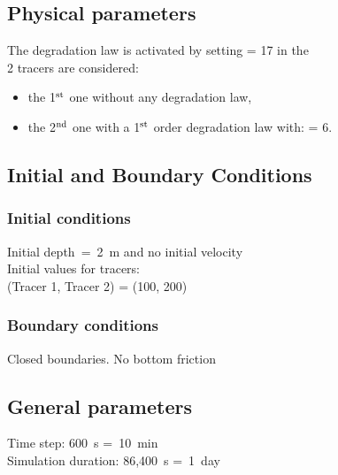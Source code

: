 \subsection{Physical parameters}
%
The degradation law is activated by setting  = 17
in the  \\

2 tracers are considered:
\begin{itemize}
\item the 1$^{\rm{st}}$ one without any degradation law,
\item the 2$^{\rm{nd}}$ one with a 1$^{\rm{st}}$ order degradation law with:
   = 6.
\end{itemize}

%
%
%
%
%
%
\subsection{Initial and Boundary Conditions}
%
\subsubsection{Initial conditions}
%
Initial depth~=~2~m
and no initial velocity\\
Initial values for tracers:\\
(Tracer 1, Tracer 2) =
(100, 200)
%
\subsubsection{Boundary conditions}
%
Closed boundaries. No bottom friction
%
\subsection{General parameters}
%
Time step: 600~s =~10~min\\
Simulation duration: 86,400~s =~1~day
%
%
%
